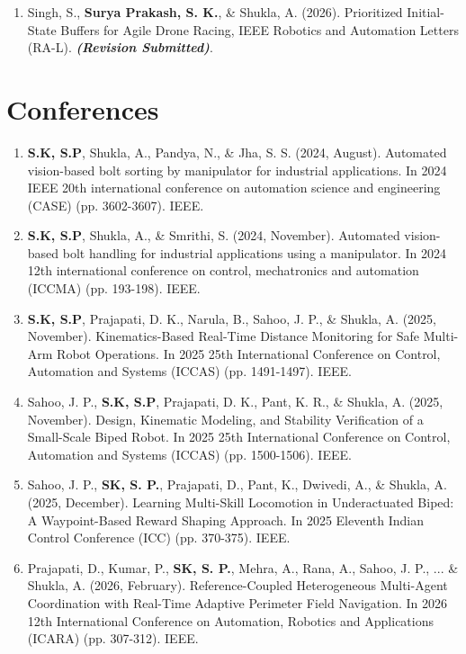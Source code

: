 \begin{Publications}
\begin{enumerate}
\item Singh, S., \textbf{Surya Prakash, S. K.}, \& Shukla, A. (2026). Prioritized Initial-State Buffers for Agile Drone Racing, IEEE Robotics and Automation Letters (RA-L). \textbf{\textit{(Revision Submitted)}}.
\end{enumerate}

\section*{Conferences}
\begin{enumerate}

\item \textbf{S.K, S.P}, Shukla, A., Pandya, N., \& Jha, S. S. (2024, August). Automated vision-based bolt sorting by manipulator for industrial applications. In 2024 IEEE 20th international conference on automation science and engineering (CASE) (pp. 3602-3607). IEEE.

\item \textbf{S.K, S.P}, Shukla, A., \& Smrithi, S. (2024, November). Automated vision-based bolt handling for industrial applications using a manipulator. In 2024 12th international conference on control, mechatronics and automation (ICCMA) (pp. 193-198). IEEE.

\item \textbf{S.K, S.P}, Prajapati, D. K., Narula, B., Sahoo, J. P., \& Shukla, A. (2025, November). Kinematics-Based Real-Time Distance Monitoring for Safe Multi-Arm Robot Operations. In 2025 25th International Conference on Control, Automation and Systems (ICCAS) (pp. 1491-1497). IEEE.

\item Sahoo, J. P., \textbf{S.K, S.P}, Prajapati, D. K., Pant, K. R., \& Shukla, A. (2025, November). Design, Kinematic Modeling, and Stability Verification of a Small-Scale Biped Robot. In 2025 25th International Conference on Control, Automation and Systems (ICCAS) (pp. 1500-1506). IEEE.

\item Sahoo, J. P., \textbf{SK, S. P.}, Prajapati, D., Pant, K., Dwivedi, A., \& Shukla, A. (2025, December). Learning Multi-Skill Locomotion in Underactuated Biped: A Waypoint-Based Reward Shaping Approach. In 2025 Eleventh Indian Control Conference (ICC) (pp. 370-375). IEEE.

\item Prajapati, D., Kumar, P., \textbf{SK, S. P.}, Mehra, A., Rana, A., Sahoo, J. P., ... \& Shukla, A. (2026, February). Reference-Coupled Heterogeneous Multi-Agent Coordination with Real-Time Adaptive Perimeter Field Navigation. In 2026 12th International Conference on Automation, Robotics and Applications (ICARA) (pp. 307-312). IEEE.


\end{enumerate}
\end{Publications}
